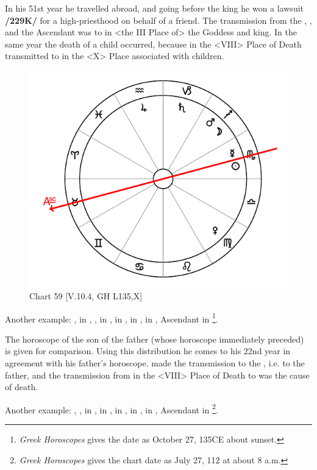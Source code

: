 In his 51st year he travelled abroad, and going before the king he won a lawsuit \textbf{/229K/} for a high-priesthood on behalf of a friend. The transmission from the \Moon, \Venus, and the Ascendant was to \Mercury\xspace in <the III Place of> the Goddess and king. In the same year the death of a child occurred, because \Mars\xspace in the <VIII> Place of Death transmitted to \Saturn\xspace in the <X> Place associated with children.

\begin{figure}
\centering
\vspace{-40pt}
\includegraphics[width=.68\textwidth]{charts/5_10_04}
\caption{Chart 59 [V.10.4, GH L135,X]}
\label{fig:chart59}
\end{figure}

\noindent Another example: \Sun, \Mercury\xspace in \Scorpio, \Moon, \Mars\xspace in \Sagittarius, \Saturn\xspace in \Capricorn, \Jupiter\xspace in \Aquarius, \Venus\xspace in \Virgo, Ascendant in \Taurus\footnote{\textit{Greek Horoscopes} gives the date as October 27, 135CE about sunset.}. 

The horoscope of the son of the father (whose horoscope immediately preceded) is given for comparison. Using this distribution he comes to his 22nd year in agreement with his father’s horoscope. \Jupiter\xspace made the transmission to the \Sun, i.e. to the father, and the transmission from \Mars\xspace in the <VIII> Place of Death to \Venus\xspace was the cause of death.

Another example: \Sun, \Mars, \Venus\xspace in \Leo, \Moon\xspace in \Aquarius, \Saturn\xspace in \Aries, \Jupiter\xspace in \Pisces,
\Mercury\xspace in \Cancer, Ascendant in \Virgo\footnote{\textit{Greek Horoscopes} gives the chart date as July 27, 112 at about 8 a.m.}. 

